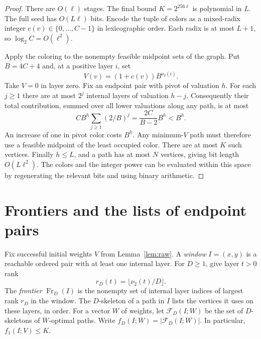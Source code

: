 \documentclass[11pt]{article}
\newcommand{\calF}{\mathcal F}
\newcommand{\fr}{\operatorname{Fr}}
\begin{document}
\begin{proof}
There are $O(\ell)$ stages. The final bound $K=2^{256\ell}$ is
polynomial in $L$. The full seed has $O(L\ell)$ bits. Encode the
tuple of colors as a mixed-radix integer $c(v)\in\{0,\ldots,C-1\}$ in
lexicographic order. Each radix is at most $L+1$, so
$\log_2 C=O(\ell^2)$.

Apply the coloring to the nonempty feasible midpoint sets of the graph.
Put $B=4C+4$ and, at a positive layer $i$, set
\[
 V(v)=(1+c(v))B^{\nu_2(i)}.
\]
Take $V=0$ in layer zero. Fix an endpoint pair with pivot of valuation
$h$. For each $j\ge 1$ there are at most $2^j$ internal layers of
valuation $h-j$. Consequently their total contribution, summed over
all lower valuations along any path, is at most
\[
 C B^h\sum_{j\ge 1}(2/B)^j
 =\frac{2C}{B-2}B^h < B^h.
\]
An increase of one in pivot color costs $B^h$. Any minimum-$V$ path
must therefore use a feasible midpoint of the least occupied color.
There are at most $K$ such vertices. Finally $h\le L$, and a path has
at most $N$ vertices, giving bit length $O(L\ell^2)$. The colors and
the integer power can be evaluated within this space by regenerating
the relevant bits and using binary arithmetic.
\end{proof}
\section{Frontiers and the lists of endpoint pairs}

Fix successful initial weights $V$ from Lemma~\ref{lem:raw}. A \emph{window}
$I=(x,y)$ is a reachable ordered pair with at least one internal layer.
For $D\ge1$, give layer $t>0$ rank
\[
                   r_D(t)=\lfloor \nu_2(t)/D\rfloor .
\]
The \emph{frontier} $\fr_D(I)$ is the nonempty set of internal layer indices
of largest rank $r_D$ in the window. The $D$-skeleton of a path in $I$
lists the vertices it uses on these layers, in order. For a vector $W$
of weights, let $\calF_D(I;W)$ be the set of $D$-skeletons of $W$-optimal paths.
Write $f_D(I;W)=|\calF_D(I;W)|$. In particular, $f_1(I;V)\le K$.
\end{document}
